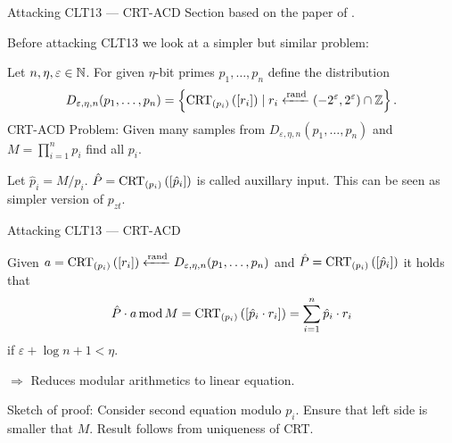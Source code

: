 \documentclass[english]{beamer}
\begin{document}
    \begin{frame}{Attacking CLT13 --- CRT-ACD}
        Section based on the paper of .

        Before attacking CLT13 we look at a simpler but similar problem:
        \begin{definition}
            Let $n, \eta, \varepsilon \in \mathbb{N}$. For given $\eta$-bit primes $p_1, \dots, p_n$ define the distribution
            \begin{equation*}
                D_{\varepsilon, \eta, n}(p_1, \dots, p_n) = \left\lbrace \operatorname{CRT}_{(p_{i})}\left(\left[r_i\right]\right) \mid r_i \xleftarrow{\mathrm{rand}} (-2^\varepsilon, 2^\varepsilon) \cap \mathbb{Z} \right\rbrace.
            \end{equation*}
            CRT-ACD Problem: Given many samples from $D_{\varepsilon, \eta, n}(p_1, \dots, p_n)$ and $M = \prod_{i=1}^n p_i$ find all $p_i$.
        \end{definition}
        \pause

        Let $\hat{p}_i = M / p_i$. $\hat{P} = \operatorname{CRT}_{(p_{i})}\left(\left[\hat{p}_i\right]\right)$ is called auxillary input. This can be seen as simpler version of $p_{zt}$.
    \end{frame}
    \begin{frame}{Attacking CLT13 --- CRT-ACD}
        \begin{lemma}
            Given $a = \operatorname{CRT}_{(p_{i})}\left(\left[r_i\right]\right) \xleftarrow{\mathrm{rand}} D_{\varepsilon, \eta, n}(p_1, \dots, p_n)$ and $\hat{P} = \operatorname{CRT}_{(p_{i})}\left(\left[\hat{p}_i\right]\right)$ it holds that
            \begin{equation*}
                \hat{P} \cdot a \operatorname{mod} M = \operatorname{CRT}_{(p_{i})}\left(\left[\hat{p}_i \cdot r_i\right]\right) = \sum_{i=1}^n \hat{p}_i \cdot r_i
            \end{equation*}
            if $\varepsilon + \log n + 1 < \eta$.
        \end{lemma}
        \pause

        $\Rightarrow$ Reduces modular arithmetics to linear equation.

        \pause
        Sketch of proof: Consider second equation modulo $p_i$. Ensure that left side is smaller that $M$. Result follows from uniqueness of CRT.
    \end{frame}
\end{document}
